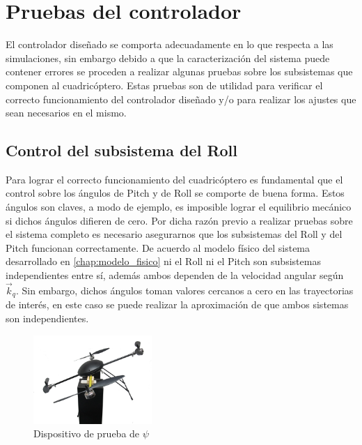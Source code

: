 \documentclass[main]{subfiles}
\begin{document}
\chapter{Pruebas del controlador}
El controlador diseñado se comporta adecuadamente en lo que respecta a las simulaciones, sin embargo debido a que la caracterizaci\'on del sistema puede contener errores se proceden a realizar algunas pruebas sobre los subsistemas que componen al cuadric\'optero. Estas pruebas son de utilidad para verificar el correcto funcionamiento del controlador diseñado y/o para realizar los ajustes que sean necesarios en el mismo.\\

\section{Control del subsistema del Roll}

Para lograr el correcto funcionamiento del cuadric\'optero es fundamental que el control sobre los \'angulos de Pitch y de Roll se comporte de buena forma. Estos \'angulos son claves, a modo de ejemplo, es imposible lograr el equilibrio mec\'anico si dichos \'angulos difieren de cero. Por dicha raz\'on previo a realizar pruebas sobre el sistema completo es necesario asegurarnos que los subsistemas del  Roll y del Pitch funcionan correctamente. De acuerdo al modelo f\'isico del sistema desarrollado en \ref{chap:modelo_fisico} ni el Roll ni el Pitch son subsistemas independientes entre s\'i, adem\'as ambos dependen de la velocidad angular seg\'un $\vec{k}_q$. Sin embargo, dichos \'angulos toman valores cercanos a cero en las trayectorias de inter\'es, en este caso se puede realizar la aproximaci\'on de que ambos sistemas son independientes.\\

\begin{figure}
	\vspace{-20pt}
	\centering
	\includegraphics[width=0.4\textwidth]{./pics_test_control/dispositivo_psi.pdf}
	\caption{Dispositivo de prueba de $\psi$}
	\label{fig:psidisp}
\end{figure}
\end{document}

